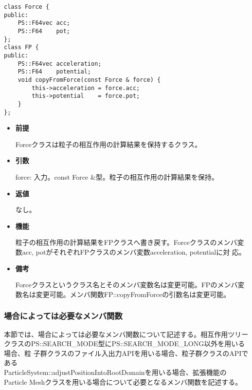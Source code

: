
\begin{screen}
\begin{verbatim}
class Force {
public:
    PS::F64vec acc;
    PS::F64    pot;
};
class FP {
public:
    PS::F64vec acceleration;
    PS::F64    potential;
    void copyFromForce(const Force & force) {
        this->acceleration = force.acc;
        this->potential    = force.pot;
    }
};
\end{verbatim}
\end{screen}

\begin{itemize}

\item {\bf 前提}

  Forceクラスは粒子の相互作用の計算結果を保持するクラス。

\item {\bf 引数}

  force: 入力。const Force \&型。粒子の相互作用の計算結果を保持。
  
\item {\bf 返値}

  なし。
  
\item {\bf 機能}

  粒子の相互作用の計算結果をFPクラスへ書き戻す。Forceクラスのメンバ変
  数acc, potがそれぞれFPクラスのメンバ変数acceleration, potentialに対
  応。
  
\item {\bf 備考}

  Forceクラスというクラス名とそのメンバ変数名は変更可能。FPのメンバ変
  数名は変更可能。メンバ関数FP::copyFromForceの引数名は変更可能。

\end{itemize}

\subsubsection{場合によっては必要なメンバ関数}


本節では、場合によっては必要なメンバ関数について記述する。相互作用ツリー
クラスのPS::SEARCH\_MODE型にPS::SEARCH\_MODE\_LONG以外を用いる場合、粒
子群クラスのファイル入出力APIを用いる場合、粒子群クラスのAPIである
\\ParticleSystem::adjustPositionIntoRootDomainを用いる場合、拡張機能の
Particle Meshクラスを用いる場合について必要となるメンバ関数を記述する。

